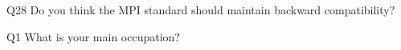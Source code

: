 \begin{description}%
\item{Q28} Do you think the MPI standard should maintain backward compatibility?%
\item{Q1} What is your main occupation?%
\end{description}%
